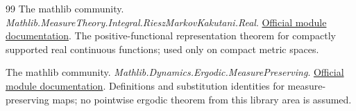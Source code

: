 \documentclass[11pt]{article}
\theoremstyle{remark}\newtheorem{remark}[theorem]{Remark}
\begin{document}
\begin{thebibliography}{99}
The mathlib community. \emph{Mathlib.MeasureTheory.Integral.RieszMarkovKakutani.Real}.
\href{https://leanprover-community.github.io/mathlib4_docs/Mathlib/MeasureTheory/Integral/RieszMarkovKakutani/Real.html}{Official module documentation}.
The positive-functional representation theorem for compactly supported real continuous functions; used only on compact metric spaces.

The mathlib community. \emph{Mathlib.Dynamics.Ergodic.MeasurePreserving}.
\href{https://leanprover-community.github.io/mathlib4_docs/Mathlib/Dynamics/Ergodic/MeasurePreserving.html}{Official module documentation}.
Definitions and substitution identities for measure-preserving maps; no pointwise ergodic theorem from this library area is assumed.
\end{thebibliography}
\end{document}
